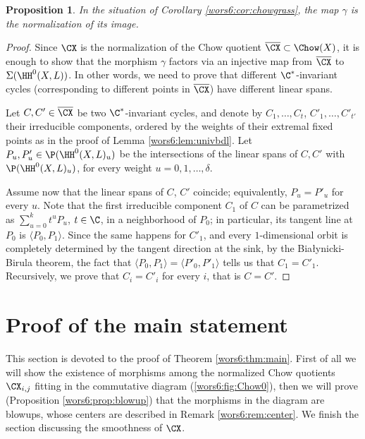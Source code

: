 \documentclass[reqno]{amsproc}
\newtheorem{proposition}[theorem]{Proposition}
\theoremstyle{definition}
\begin{document}
\begin{proposition}\label{wors6:prop:normal}
In the situation of Corollary \ref{wors6:cor:chowgrass}, the map $\gamma$ is the normalization of its image.
\end{proposition}

\begin{proof}
Since $\CX$ is the normalization of the Chow quotient   $\overline{\CX}\subset\Chow(X)$, it is enough to show that the morphism $\gamma$ factors via an injective map from $\overline{\CX}$ to $\Sigma(\HH^0(X,L))$. In other words, we need to prove that different $\C^*$-invariant cycles (corresponding to different points in $\overline{\CX}$) have different linear spans.

Let $C,C'\in\overline{\CX}$ be two $\C^*$-invariant cycles, and denote by $C_1,\dots ,C_t
$, $C'_1,\dots ,C'_{t'}$ their irreducible components, ordered by the weights of their extremal fixed points as in the proof of Lemma \ref{wors6:lem:univbdl}. Let $P_u, P'_u\in\P(\HH^0(X,L)_u)$ be the intersections of the linear spans of $C,C'$ with $\P(\HH^0(X,L)_u)$, for every weight $u=0,1,\dots,\delta$. 


Assume now that the linear spans of $C$, $C'$ coincide; equivalently,  $P_u=P'_u$ for every $u$. Note that the first irreducible component $C_1$ of $C$ can be parametrized as $\sum_{u=0}^{k}t^uP_u$, $t\in\C$, in a neighborhood of $P_0$; in particular, its tangent line at $P_0$ is $\langle P_0,P_1\rangle$. Since the same happens for $C'_1$, and every $1$-dimensional orbit is completely determined by the tangent direction  at the sink, by the Bia{\l}ynicki-Birula theorem, the fact that $\langle P_0,P_1\rangle=\langle P'_0,P'_1\rangle$ tells us that $C_1=C'_1$. Recursively, we prove that $C_i=C'_i$ for every $i$, that is $C=C'$.
\end{proof}


\section{Proof of the main statement}\label{wors6:sec:main}

This section is devoted to the proof of Theorem \ref{wors6:thm:main}. First of all we will show the existence of morphisms among the normalized Chow quotients $\CX_{i,j}$ fitting in the commutative diagram (\ref{wors6:fig:Chow0}), then we will prove (Proposition \ref{wors6:prop:blowup}) that the morphisms in the diagram are blowups, whose centers are described in Remark \ref{wors6:rem:center}. We finish the section discussing the smoothness of $\CX$. 
\end{document}
